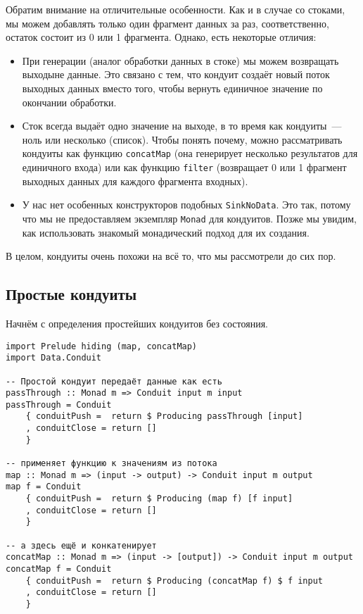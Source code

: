 Обратим внимание на отличительные особенности. Как и в случае со стоками, мы можем
добавлять только один фрагмент данных за раз, соответственно, остаток состоит из 0 или 1 фрагмента.
Однако, есть некоторые отличия:

\begin{itemize}
\item При генерации (аналог обработки данных в стоке) мы можем возвращать выходыне данные.
Это связано с тем, что кондуит создаёт новый поток выходных данных вместо того, чтобы вернуть единичное значение по окончании обработки.
\item Сток всегда выдаёт одно значение на выходе, в то время как кондуиты~--- ноль или
несколько (список). Чтобы понять почему, можно рассматривать кондуиты как функцию
\lstinline'concatMap' (она генерирует несколько результатов для единичного входа)
или как функцию \lstinline'filter' (возвращает 0 или 1 фрагмент выходных данных для каждого фрагмента входных).
\item У нас нет особенных конструкторов подобных \lstinline'SinkNoData'. Это так, потому что мы не
предоставляем
экземпляр \lstinline'Monad' для кондуитов. Позже мы увидим, как использовать знакомый
монадический подход для их создания.
\end{itemize}
В целом, кондуиты очень похожи на всё то, что мы рассмотрели до сих пор.

\subsection{Простые кондуиты}

Начнём с определения простейших кондуитов без состояния.
\begin{lstlisting}
import Prelude hiding (map, concatMap)
import Data.Conduit

-- Простой кондуит передаёт данные как есть
passThrough :: Monad m => Conduit input m input
passThrough = Conduit
    { conduitPush =  return $ Producing passThrough [input]
    , conduitClose = return []
    }

-- применяет функцию к значениям из потока
map :: Monad m => (input -> output) -> Conduit input m output
map f = Conduit
    { conduitPush =  return $ Producing (map f) [f input]
    , conduitClose = return []
    }

-- а здесь ещё и конкатенирует
concatMap :: Monad m => (input -> [output]) -> Conduit input m output
concatMap f = Conduit
    { conduitPush =  return $ Producing (concatMap f) $ f input
    , conduitClose = return []
    }
\end{lstlisting}

